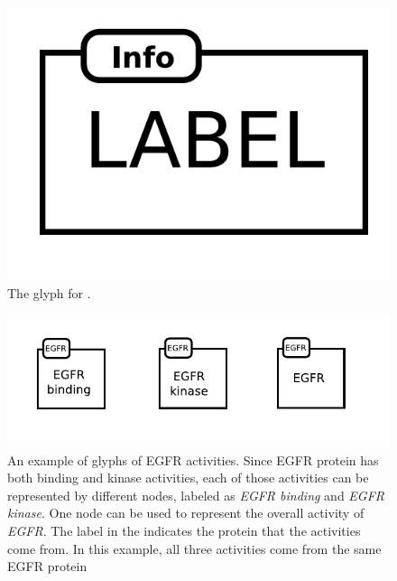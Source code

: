 \begin{figure}[H]
  \centering
  \includegraphics[scale=0.5]{images/biologicalActivity}
  \caption{The \AF glyph for .}
  \label{fig:af:biologicalActivity}
\end{figure}

\begin{figure}[H]
  \centering
  \includegraphics[scale = 1]{examples/EGFR}
  \caption{An example of \AF glyphs of EGFR activities.  Since EGFR protein has both binding and kinase activities, each of those activities can be represented by different nodes, labeled as \emph{EGFR binding} and \emph{EGFR kinase}.  One node can be used to represent the overall activity of \emph{EGFR}.  The label in the  indicates the protein that the activities come from.  In this example, all three activities come from the same EGFR protein}
  \label{fig:af:EGFR}
\end{figure} 
